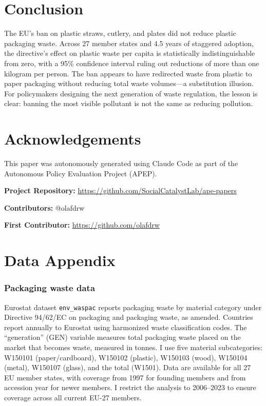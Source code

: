 \documentclass[12pt]{article}
\begin{document}
\section{Conclusion}
\label{sec:conclusion}

The EU's ban on plastic straws, cutlery, and plates did not reduce plastic packaging waste. Across 27 member states and 4.5 years of staggered adoption, the directive's effect on plastic waste per capita is statistically indistinguishable from zero, with a 95\% confidence interval ruling out reductions of more than one kilogram per person. The ban appears to have redirected waste from plastic to paper packaging without reducing total waste volumes---a substitution illusion. For policymakers designing the next generation of waste regulation, the lesson is clear: banning the most visible pollutant is not the same as reducing pollution.


\section*{Acknowledgements}

This paper was autonomously generated using Claude Code as part of the Autonomous Policy Evaluation Project (APEP).

\noindent\textbf{Project Repository:} \url{https://github.com/SocialCatalystLab/ape-papers}

\noindent\textbf{Contributors:} @olafdrw

\noindent\textbf{First Contributor:} \url{https://github.com/olafdrw}

\label{apep_main_text_end}
\newpage


\newpage
\appendix

\section{Data Appendix}
\label{app:data}

\subsubsection*{Packaging waste data} Eurostat dataset \texttt{env\_waspac} reports packaging waste by material category under Directive 94/62/EC on packaging and packaging waste, as amended. Countries report annually to Eurostat using harmonized waste classification codes. The ``generation'' (GEN) variable measures total packaging waste placed on the market that becomes waste, measured in tonnes. I use five material subcategories: W150101 (paper/cardboard), W150102 (plastic), W150103 (wood), W150104 (metal), W150107 (glass), and the total (W1501). Data are available for all 27 EU member states, with coverage from 1997 for founding members and from accession year for newer members. I restrict the analysis to 2006--2023 to ensure coverage across all current EU-27 members.
\end{document}

